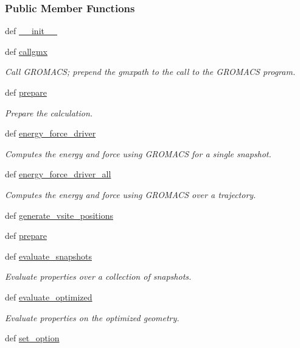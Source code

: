 \subsubsection*{Public Member Functions}
\begin{DoxyCompactItemize}
\item 
def \hyperlink{classforcebalance_1_1gmxio_1_1GMX_a4d5f9e8fb40a37a4c22551d2f30418f4}{\-\_\-\-\_\-init\-\_\-\-\_\-}
\item 
def \hyperlink{classforcebalance_1_1gmxio_1_1GMX_a4e472c27d2c244c9ad6edb5b35f46a75}{callgmx}
\begin{DoxyCompactList}\small\item\em Call G\-R\-O\-M\-A\-C\-S; prepend the gmxpath to the call to the G\-R\-O\-M\-A\-C\-S program. \end{DoxyCompactList}\item 
def \hyperlink{classforcebalance_1_1gmxio_1_1GMX_af2dcb1a6a406a62e38985673bd903463}{prepare}
\begin{DoxyCompactList}\small\item\em Prepare the calculation. \end{DoxyCompactList}\item 
def \hyperlink{classforcebalance_1_1gmxio_1_1GMX_a2256beedb26e249848acc34db64f4a74}{energy\-\_\-force\-\_\-driver}
\begin{DoxyCompactList}\small\item\em Computes the energy and force using G\-R\-O\-M\-A\-C\-S for a single snapshot. \end{DoxyCompactList}\item 
def \hyperlink{classforcebalance_1_1gmxio_1_1GMX_af253e5d8ea66628a0bc755339b488dcb}{energy\-\_\-force\-\_\-driver\-\_\-all}
\begin{DoxyCompactList}\small\item\em Computes the energy and force using G\-R\-O\-M\-A\-C\-S over a trajectory. \end{DoxyCompactList}\item 
def \hyperlink{classforcebalance_1_1gmxio_1_1GMX_aea0f6d954e7042b70221a55e600f89a5}{generate\-\_\-vsite\-\_\-positions}
\item 
def \hyperlink{classforcebalance_1_1engine_1_1Engine_a2eab57877002b41dc3742f0c67f2f24e}{prepare}
\item 
def \hyperlink{classforcebalance_1_1engine_1_1Engine_aceb1ac74d5f048dfbe620ceac7df8d32}{evaluate\-\_\-snapshots}
\begin{DoxyCompactList}\small\item\em Evaluate properties over a collection of snapshots. \end{DoxyCompactList}\item 
def \hyperlink{classforcebalance_1_1engine_1_1Engine_a0e88d58a45ebff5a5d741290e3589ee6}{evaluate\-\_\-optimized}
\begin{DoxyCompactList}\small\item\em Evaluate properties on the optimized geometry. \end{DoxyCompactList}\item 
def \hyperlink{classforcebalance_1_1BaseClass_a73e9a37a7632e79eb99f49bd15aced45}{set\-\_\-option}
\end{DoxyCompactItemize}
